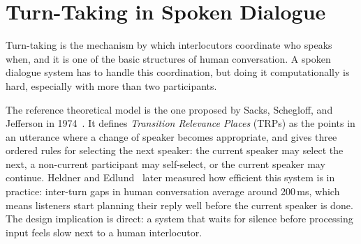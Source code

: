 
\section{Turn-Taking in Spoken Dialogue}
\label{sec:turntaking}

Turn-taking is the mechanism by which interlocutors coordinate who speaks when, and it is one of the basic structures of human conversation. A spoken dialogue system has to handle this coordination, but doing it computationally is hard, especially with more than two participants.

The reference theoretical model is the one proposed by Sacks, Schegloff, and Jefferson in 1974~\cite{sacks1974turntaking}. It defines \emph{Transition Relevance Places} (TRPs) as the points in an utterance where a change of speaker becomes appropriate, and gives three ordered rules for selecting the next speaker: the current speaker may select the next, a non-current participant may self-select, or the current speaker may continue. Heldner and Edlund~\cite{heldner2010pauses} later measured how efficient this system is in practice: inter-turn gaps in human conversation average around 200\,ms, which means listeners start planning their reply well before the current speaker is done. The design implication is direct: a system that waits for silence before processing input feels slow next to a human interlocutor.

